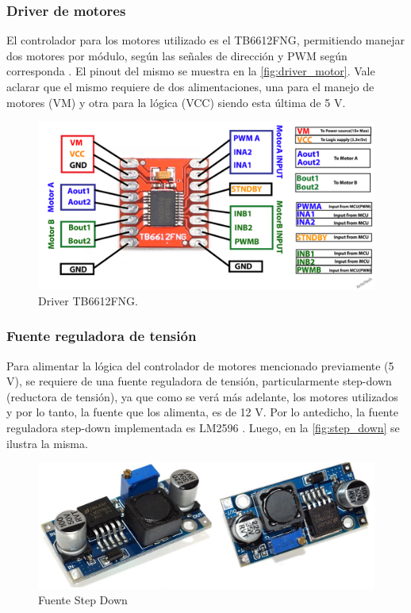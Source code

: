 \documentclass[11pt,a4paper]{article}
\begin{document}
	\subsubsection{Driver de motores}
	El controlador para los motores utilizado es el TB6612FNG, permitiendo manejar dos motores por módulo, según las señales de dirección y PWM según corresponda \cite{Driver de motor TB6612FNG}. El pinout del mismo se muestra en la \autoref*{fig:driver_motor}. Vale aclarar que el mismo requiere de dos alimentaciones, una para el manejo de motores (VM) y otra para la lógica (VCC) siendo esta última de 5 V.
	
	\begin{figure}[h!]
		\centering
		\includegraphics[width=\linewidth]{imagenes/driver_pinout.png}
		\caption{Driver TB6612FNG.}
		\label{fig:driver_motor}
	\end{figure}
	
	
	
	\subsubsection{Fuente reguladora de tensión}
	Para alimentar la lógica del controlador de motores mencionado previamente (5 V), se requiere de una fuente reguladora de tensión, particularmente step-down (reductora de tensión), ya que como se verá más adelante, los motores utilizados y por lo tanto, la fuente que los alimenta, es de 12 V. Por lo antedicho, la fuente reguladora step-down implementada es LM2596 \cite{fuente step-down}. Luego, en la \autoref*{fig:step_down} se ilustra la misma.
	
	\begin{figure}[h!]
		\centering
		\includegraphics[width=\linewidth]{imagenes/fuente_reg2.jpg}
		\caption{Fuente Step Down}
		\label{fig:step_down}
	\end{figure}
	
\end{document}
